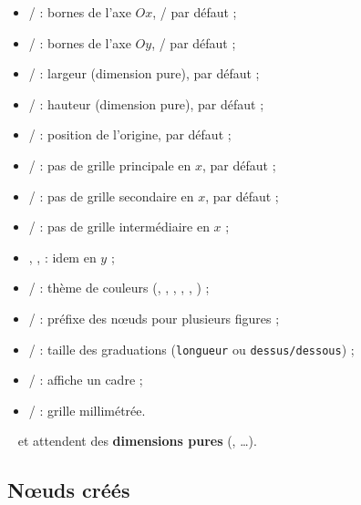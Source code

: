 \documentclass[11pt,a4paper]{ltxdoc}
\begin{document}
\begin{itemize}
	\item {}/ : bornes de l'axe $Ox$, / par défaut ;
	\item {}/ : bornes de l'axe $Oy$, / par défaut ;
	\item {} /  : largeur (dimension pure), \MontreCode{8cm} par défaut ;
	\item {} /  : hauteur (dimension pure), \MontreCode{6cm} par défaut ;
	\item {} /  : position de l'origine,  par défaut ;
	\item {} /  : pas de grille principale en $x$,  par défaut ;
	\item {} /  : pas de grille secondaire en $x$,  par défaut ;
	\item {} /  : pas de grille intermédiaire en $x$ ;
	\item {}, ,  : idem en $y$ ;
	\item {} /  : thème de couleurs (, , , , , ) ;
	\item {} /  : préfixe des nœuds pour plusieurs figures ;
	\item {} /  : taille des graduations (\texttt{longueur} ou \texttt{dessus/dessous}) ;
  \item {} /  : affiche un cadre ;
	\item {} /  : grille millimétrée.
\end{itemize}

{\footnotesize\faBomb}~ et  attendent des \textbf{dimensions pures} (\MontreCode{8cm}, \MontreCode{120mm}\ldots).

\subsection{Nœuds créés}
\end{document}
